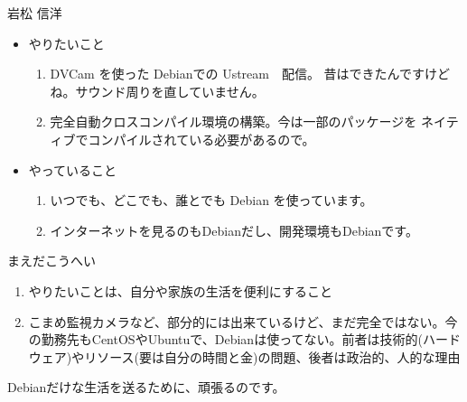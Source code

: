 \begin{prework}{ 岩松 信洋 }
  \begin{itemize}
  \item やりたいこと
  \begin{enumerate}
  \item DVCam を使った Debianでの Ustream　配信。
  昔はできたんですけどね。サウンド周りを直していません。
  \item 完全自動クロスコンパイル環境の構築。今は一部のパッケージを
  ネイティブでコンパイルされている必要があるので。
  \end{enumerate}
  \item やっていること
  \begin{enumerate}
  \item いつでも、どこでも、誰とでも Debian を使っています。
  \item インターネットを見るのもDebianだし、開発環境もDebianです。
  \end{enumerate}
  \end{itemize}
\end{prework}



\begin{prework}{ まえだこうへい }

  \begin{enumerate}
  \item やりたいことは、自分や家族の生活を便利にすること
  \item こまめ監視カメラなど、部分的には出来ているけど、まだ完全ではない。今の勤務先もCentOSやUbuntuで、Debianは使ってない。前者は技術的(ハードウェア)やリソース(要は自分の時間と金)の問題、後者は政治的、人的な理由
  \end{enumerate}
  Debianだけな生活を送るために、頑張るのです。
\end{prework}

